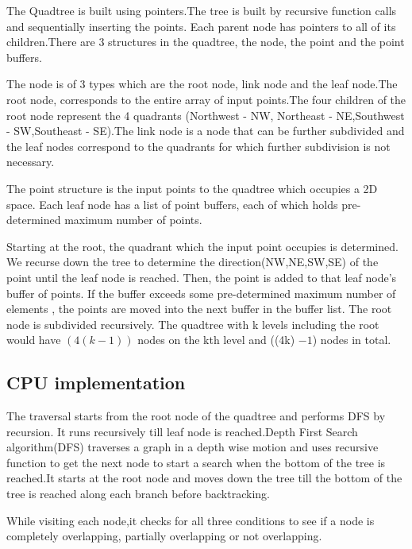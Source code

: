 \documentclass{article}
\begin{document}
The Quadtree is built using pointers.The tree is built by recursive function calls and sequentially inserting the points. Each parent node has pointers to all of its children.There are 3 structures in the quadtree, the node, the point and the point buffers. 

The node is of 3 types which are the root node, link node and the leaf node.The root node,  corresponds to the entire array of input points.The four children of the root node represent the 4 quadrants (Northwest - NW, Northeast - NE,Southwest - SW,Southeast - SE).The link node is a node that can be further subdivided and the leaf nodes correspond to the quadrants for which further subdivision is not necessary. 

The point structure is the input points to the quadtree which occupies a 2D space. Each leaf node has a list of point buffers, each of which holds pre-determined maximum number of points.

Starting at the root, the quadrant which the input point occupies is determined. We recurse down the tree to determine the direction(NW,NE,SW,SE) of the point until the leaf node is reached. 
Then,  the point is added to that leaf node's buffer of points. If the buffer exceeds some pre-determined maximum number of elements , the points are moved into the next buffer in the buffer list. 
The root node is subdivided recursively. The quadtree with k levels including the root would have ${(4(k-1))}$ nodes on the kth level and  ((4k) $-1$) nodes in total.


\subsection{CPU implementation}

The traversal starts from the root node of the quadtree and performs DFS by recursion.
It runs recursively till leaf node is reached.Depth First Search algorithm(DFS) traverses a graph in a depth wise motion and uses recursive function to get the next node to start a search when the bottom of the tree is reached.It starts at the root node and moves down the tree till the bottom of the tree is reached along each branch before backtracking.

While visiting each node,it checks for all three conditions to see if a node is completely overlapping, partially overlapping or not overlapping.
\end{document}

